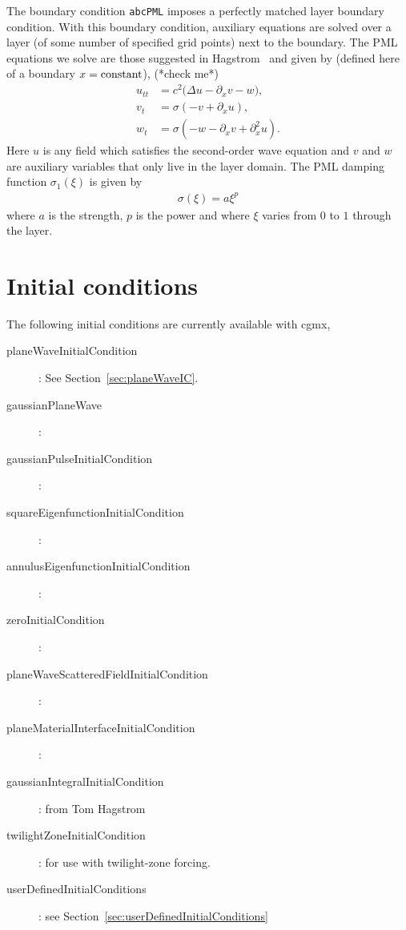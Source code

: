 \documentclass{article}
\begin{document}
The boundary condition {\tt abcPML} imposes a perfectly matched layer boundary condition.
With this boundary condition, auxiliary equations are solved over a layer (of some number of
specified grid points) next to the boundary. The PML equations we solve
are those suggested in Hagstrom~\cite{Hagstrom1999} and given by (defined here of a boundary $x={\rm constant}$), (*check me*)
\begin{align}
  u_{tt} &= c^2 \Big( \Delta u - \partial_x v - w \Big), \\
   v_t &= \sigma( -v + \partial_x u ) , \\
   w_t &= \sigma ( -w  - \partial_x v + \partial_x^2 u ). 
\end{align}
Here $u$ is any field which satisfies the second-order wave equation and $v$ and $w$ are auxiliary variables
that only live in the layer domain. 
The PML damping function $\sigma_1(\xi)$ is given by 
\begin{align}
  \sigma(\xi) = a \xi^p
\end{align}
where $a$ is the strength, $p$ is the power and where $\xi$ varies from $0$ to $1$ through the layer.






\clearpage
\section{Initial conditions} \label{sec:ic}

\noindent The following initial conditions are currently available with cgmx,
\begin{description}
  \item[planeWaveInitialCondition]: See Section~\ref{sec:planeWaveIC}. 
  \item[gaussianPlaneWave]:
  \item[gaussianPulseInitialCondition]:
  \item[squareEigenfunctionInitialCondition]:  
  \item[annulusEigenfunctionInitialCondition]:
  \item[zeroInitialCondition]:
  \item[planeWaveScatteredFieldInitialCondition]:
  \item[planeMaterialInterfaceInitialCondition]:
  \item[gaussianIntegralInitialCondition]:   from Tom Hagstrom
  \item[twilightZoneInitialCondition]: for use with twilight-zone forcing. 
  \item[userDefinedInitialConditions] : see Section~\ref{sec:userDefinedInitialConditions}
\end{description}
\end{document}
